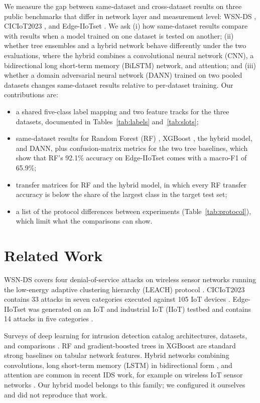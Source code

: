 \documentclass[conference]{IEEEtran}
\begin{document}
We measure the gap between same-dataset and cross-dataset results on three public benchmarks that differ in network layer and measurement level: WSN-DS \cite{almomani2016}, CICIoT2023 \cite{neto2023}, and Edge-IIoTset \cite{ferrag2022}. We ask (i) how same-dataset results compare with results when a model trained on one dataset is tested on another; (ii) whether tree ensembles and a hybrid network behave differently under the two evaluations, where the hybrid combines a convolutional neural network (CNN), a bidirectional long short-term memory (BiLSTM) network, and attention; and (iii) whether a domain adversarial neural network (DANN) \cite{ganin2016} trained on two pooled datasets changes same-dataset results relative to per-dataset training. Our contributions are:
\begin{itemize}
\item a shared five-class label mapping and two feature tracks for the three datasets, documented in Tables~\ref{tab:labels} and~\ref{tab:slots};
\item same-dataset results for Random Forest (RF) \cite{breiman2001}, XGBoost \cite{chen2016}, the hybrid model, and DANN, plus confusion-matrix metrics for the two tree baselines, which show that RF's 92.1\% accuracy on Edge-IIoTset comes with a macro-F1 of 65.9\%;
\item transfer matrices for RF and the hybrid model, in which every RF transfer accuracy is below the share of the largest class in the target test set;
\item a list of the protocol differences between experiments (Table~\ref{tab:protocol}), which limit what the comparisons can show.
\end{itemize}

\section{Related Work}\label{sec:related}
WSN-DS covers four denial-of-service attacks on wireless sensor networks running the low-energy adaptive clustering hierarchy (LEACH) protocol \cite{heinzelman2000,almomani2016}. CICIoT2023 contains 33 attacks in seven categories executed against 105 IoT devices \cite{neto2023}. Edge-IIoTset was generated on an IoT and industrial IoT (IIoT) testbed and contains 14 attacks in five categories \cite{ferrag2022}.

Surveys of deep learning for intrusion detection catalog architectures, datasets, and comparisons \cite{ferrag2020}. RF \cite{breiman2001} and gradient-boosted trees in XGBoost \cite{chen2016} are standard strong baselines on tabular network features. Hybrid networks combining convolutions, long short-term memory (LSTM) \cite{hochreiter1997} in bidirectional form \cite{schuster1997}, and attention \cite{vaswani2017} are common in recent IDS work, for example on wireless IoT sensor networks \cite{phalaagae2025}. Our hybrid model belongs to this family; we configured it ourselves and did not reproduce that work.
\end{document}
